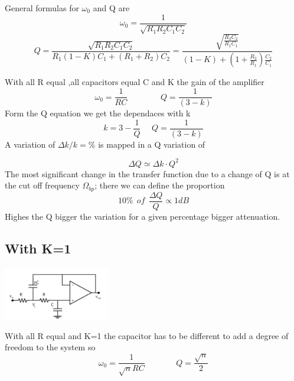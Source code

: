 General formulas for $\omega_0$ and Q are
\begin{equation}
\omega_0=\frac{1}{\sqrt{R_1R_2C_1C_2}}
\end{equation}
\begin{equation}
Q=\frac{\sqrt{R_1R_2C_1C_2}}{R_1(1-K)C_1+(R_1+R_2)C_2}=\frac{\sqrt{\frac{R_2C_2}{R_1C_1}}}{(1-K)+(1+\frac{R_2}{R_1})\frac{C_2}{C_1}}
\end{equation}


With all R equal ,all capacitors equal C and K the gain of the amplifier 
\begin{equation}
\omega_0=\frac{1}{RC}\ \ \ \ \ \ \ \ \ \  \ \ \ \ \ \ \ \ Q=\frac{1}{(3-k)}
\end{equation}
Form the Q equation we get the dependaces with k 
\begin{equation}
k=3-\frac{1}{Q} \ \ \ \ \ \ Q=\frac{1}{(3-k)}
\end{equation}
A variation of $\Delta k/k=\%$ is mapped in a Q variation of 

\begin{equation}
\Delta Q \simeq \Delta k \cdot Q^2
\end{equation}
The most significant change in the transfer function due to a change of Q is at the cut off frequency $\Omega_{bp}$; there we can define the proportion
\begin{equation}
10\% \ \ of \ \ \frac{\Delta Q}{Q} \propto 1dB
\end{equation}
Highes the Q bigger the variation for a given percentage bigger attenuation.\\


\subsection{With K=1}
\centering
\includegraphics[width=0.35\textwidth]{skb.png}\\
\raggedright

With all R equal and K=1 the capacitor has to be different to add a degree of freedom to the system so
\begin{equation}
\omega_0=\frac{1}{\sqrt{n}RC}\ \ \ \ \ \ \ \ \ \ \ \ \ \ \ \ \ Q=\frac{\sqrt{n}}{2}
\end{equation}

